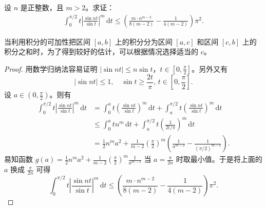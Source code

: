 \documentclass[../../main.tex]{subfiles}
\begin{document}
\begin{example}
设 \( n \) 是正整数，且 \( m > 2 \)。求证：
\begin{align*}
\int_{0}^{\pi/2} t \left| \frac{\sin nt}{\sin t} \right|^m \, \mathrm{d}t \leqslant \left( \frac{m \cdot n^{m - 2}}{8(m - 2)} - \frac{1}{4(m - 2)} \right) \pi^2.
\end{align*}
\end{example}
\begin{remark}
当利用积分的可加性把区间 \( [a, b] \) 上的积分分为区间 \( [a, c] \) 和区间 \( [c, b] \) 上的积分之和时，为了得到较好的估计，可以根据情况选择适当的 \( c \)。
\end{remark}
\begin{proof}
用数学归纳法容易证明 \( |\sin nt| \leqslant n \sin t \)，\( t \in \left[ 0, \frac{\pi}{2} \right] \)。另外又有
\[
|\sin nt| \leqslant 1, \quad \sin t \geqslant \frac{2t}{\pi}, \, t \in \left[ 0, \frac{\pi}{2} \right].
\]
设 \( a \in \left( 0, \frac{\pi}{2} \right) \)。则有
\begin{align*}
\int_{0}^{\pi/2} t \left| \frac{\sin nt}{\sin t} \right|^m \, \mathrm{d}t &= \int_{0}^{a} t \left( \frac{\sin nt}{\sin t} \right)^m \, \mathrm{d}t + \int_{a}^{\pi/2} t \left( \frac{\sin nt}{\sin t} \right)^m \, \mathrm{d}t \\
&\leqslant \int_{0}^{a} tn^m \, \mathrm{d}t + \int_{a}^{\pi/2} t \left( \frac{1}{2t/\pi} \right)^m \, \mathrm{d}t \\
&= \frac{1}{2} n^m a^2 + \frac{1}{m - 2} \left( \frac{\pi}{2} \right)^m \left( \frac{1}{a^{m - 2}} - \frac{1}{(\pi/2)^{m - 2}} \right).
\end{align*}
易知函数 \( g(a) = \frac{1}{2} n^m a^2 + \frac{1}{m - 2} \left( \frac{\pi}{2} \right)^m \frac{1}{a^{m - 2}} \) 当 \( a = \frac{\pi}{2n} \) 时取最小值。于是将上面的 \( a \) 换成 \( \frac{\pi}{2n} \) 可得
\[
\int_{0}^{\pi/2} t \left| \frac{\sin nt}{\sin t} \right|^m \, \mathrm{d}t \leqslant \left( \frac{m \cdot n^{m - 2}}{8(m - 2)} - \frac{1}{4(m - 2)} \right) \pi^2.
\]

\end{proof}
\end{document}
